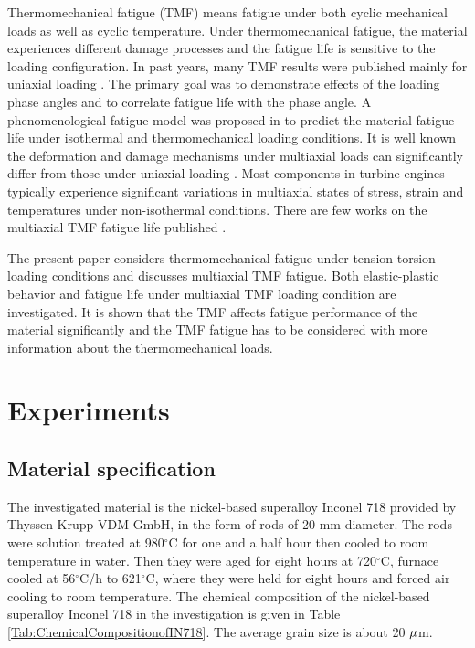 \documentclass[preprint,5p,twocolumn,11pt,sort&compress]{elsarticle}
\begin{document}
Thermomechanical fatigue (TMF) means fatigue under both cyclic mechanical loads as well as cyclic temperature. Under thermomechanical fatigue, the material experiences different damage processes and the fatigue life is sensitive to the loading configuration. In past years, many TMF results were published mainly for uniaxial loading \cite{Evans2008, Kulawinski2015, Remy2003, Bauer2009}. The primary goal was to demonstrate effects of the loading phase angles and to correlate fatigue life with the phase angle. A phenomenological fatigue model was proposed in \cite{Vose2013} to predict the material fatigue life under isothermal and thermomechanical loading conditions. It is well known the deformation and damage mechanisms under multiaxial loads can significantly differ from those under uniaxial loading \cite{Fang2015, Kang2004, Chen2004}. Most components in turbine engines typically experience significant variations in multiaxial states of stress, strain and temperatures under non-isothermal conditions. There are few works on the multiaxial TMF fatigue life published \cite{Brookes2010}.

The present paper considers thermomechanical fatigue under tension-torsion loading conditions and discusses multiaxial TMF fatigue. Both elastic-plastic behavior and fatigue life under multiaxial TMF loading condition are investigated. It is shown that the TMF affects fatigue performance of the material significantly and the TMF fatigue has to be considered with more information about the thermomechanical loads.

\section{Experiments}
\subsection{Material specification}
The investigated material is the nickel-based superalloy Inconel 718 provided by Thyssen Krupp VDM GmbH, in the form of rods of 20 mm diameter.
The rods were solution treated at 980$^{\circ}$C for one and a half hour then cooled to room temperature in water.
Then they were aged for eight hours at 720$^{\circ}$C, furnace cooled at 56$^{\circ}$C/h to 621$^{\circ}$C, where they were held for eight hours and forced air cooling to room temperature.
The chemical composition of the nickel-based superalloy Inconel 718 in the investigation is given in Table \ref{Tab:ChemicalCompositionofIN718}.
The average grain size is about 20 $\rm{\mu }$m.
\end{document}
